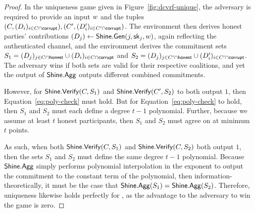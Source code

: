 \begin{proof}
  In the uniqueness game given in Figure~\ref{fig:dcvrf-unique},
  the adversary is required to provide an input $w$ and the tuples
  $(C, (D_i)_{i \in C \cap \mathsf{corrupt}}), (C', (D_i')_{i \in C' \cap \mathsf{corrupt}})$.
  The environment then derives honest parties' contributions
  $( D_j) \gets \mathsf{Shine}.\mathsf{Gen}(j, \mathsf{sk}_j, w)$, again reflecting the authenticated channel,
  and the environment derives the commitment sets
  $S_1 = (D_j)_{j \in C \cap \mathsf{honest}} \cup (D_i)_{i \in C \cap \mathsf{corrupt}}$
  and $S_2 = (D_j)_{j \in C' \cap \mathsf{honest}} \cup (D_i')_{i \in C' \cap \mathsf{corrupt}}$.
  The adversary wins if both sets are valid for their respective coalitions,
  and yet the output of $\mathsf{Shine}.\mathsf{Agg}$ outputs different combined commitments.

  However,
  for $\mathsf{Shine}.\mathsf{Verify}(C, S_1)$ and $\mathsf{Shine}.\mathsf{Verify}(C', S_2)$ to both output $1$,
  then Equation~\ref{eq:poly-check} must hold.
  But for Equation~\ref{eq:poly-check} to hold,
  then $S_1$ and $S_2$ must each define a degree $t-1$ polynomial.
  Further, because we assume at least $t$ honest participants,
  then $S_1$ and $S_2$ must agree on at minimum $t$ points.


  As such, when both $\mathsf{Shine}.\mathsf{Verify}(C, S_1)$ and $\mathsf{Shine}.\mathsf{Verify}(C, S_2)$ both output $1$,
  then the sets $S_1$ and $S_2$ must define the same degree $t-1$ polynomial.
  Because $\mathsf{Shine}.\mathsf{Agg}$ simply performs polynomial interpolation in the exponent to output the commitment to the constant term of the polynomial,
  then information-theoretically,
  it must be the case that $\mathsf{Shine}.\mathsf{Agg}(S_1) = \mathsf{Shine}.\mathsf{Agg}(S_2)$.
  Therefore, uniqueness likewise holds perfectly for \DVRFOne,
  as the advantage to the adversary to win the game is zero.
\end{proof}

